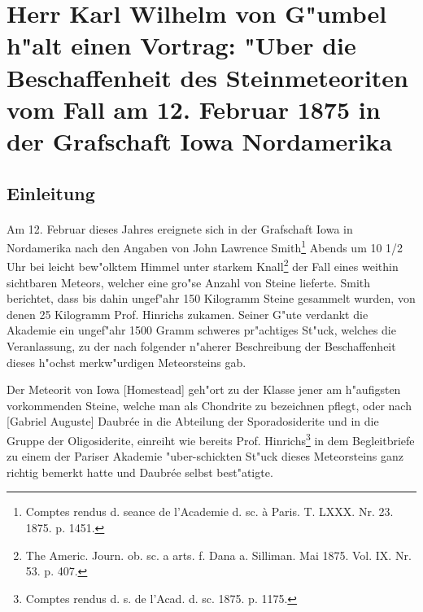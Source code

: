 \documentclass[a4paper, 11pt, oneside]{article}
\begin{document}
\section{Herr Karl Wilhelm von G"umbel h"alt einen Vortrag: "Uber die Beschaffenheit des Steinmeteoriten vom Fall am 12. Februar 1875 in der Grafschaft Iowa Nordamerika}
\subsection*{Einleitung}
\paragraph{}
Am 12. Februar dieses Jahres ereignete sich in der Grafschaft Iowa in Nordamerika nach den Angaben von John Lawrence Smith\footnote{Comptes rendus d. seance de l'Academie d. sc. à Paris. T. LXXX. Nr. 23. 1875. p. 1451.} Abends um 10 1/2 Uhr bei leicht bew"olktem Himmel unter starkem Knall\footnote{The Americ. Journ. ob. sc. a arts. f. Dana a. Silliman. Mai 1875. Vol. IX. Nr. 53. p. 407.} der Fall eines weithin sichtbaren Meteors, welcher eine gro"se Anzahl von Steine lieferte. Smith berichtet, dass bis dahin ungef"ahr 150 Kilogramm Steine gesammelt wurden, von denen 25 Kilogramm Prof. Hinrichs zukamen. Seiner G"ute verdankt die Akademie ein ungef"ahr 1500 Gramm schweres pr"achtiges St"uck, welches die Veranlassung, zu der nach folgender n"aherer Beschreibung der Beschaffenheit dieses h"ochst merkw"urdigen Meteorsteins gab.

Der Meteorit von Iowa [Homestead] geh"ort zu der Klasse jener am h"aufigsten vorkommenden Steine, welche man als Chondrite zu bezeichnen pflegt, oder nach [Gabriel Auguste] Daubrée in die Abteilung der Sporadosiderite und in die Gruppe der Oligosiderite, einreiht wie bereits Prof. Hinrichs\footnote{Comptes rendus d. s. de l'Acad. d. sc. 1875. p. 1175.} in dem Begleitbriefe zu einem der Pariser Akademie "uber-schickten St"uck dieses Meteorsteins ganz richtig bemerkt hatte und Daubrée selbst best"atigte.
\end{document}

